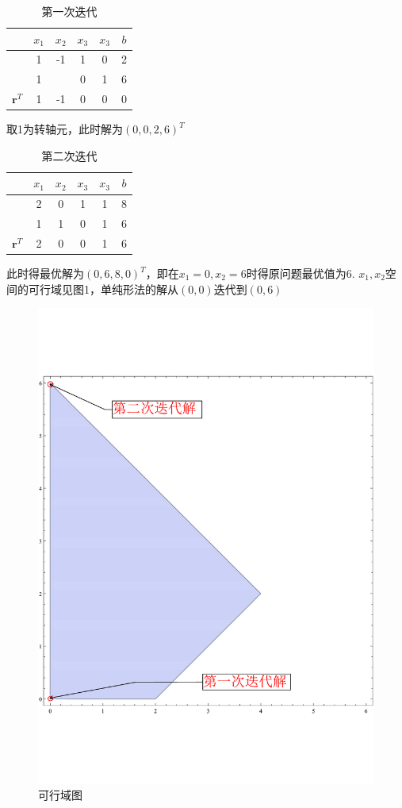 \documentclass[UTF8]{ctexart}
\begin{document}
\begin{enumerate}
\begin{table}[H]
\centering
	\begin{tabular}{cccccc}
	\toprule
	{}&$x_1$&$x_2$&$x_3$&$x_3$&$b$\\
	\midrule
	{}&1&-1&1&0&2\\
	{}&1&\boxed{1} &0&1&6\\
	$\bm{r}^T$&1&-1&0&0&0\\
	\bottomrule
	\end{tabular}
	\caption{第一次迭代}
\end{table}
取1为转轴元，此时解为$(0,0,2,6)^T$
\begin{table}[H]
\centering
	\begin{tabular}{cccccc}
	\toprule
	{}&$x_1$&$x_2$&$x_3$&$x_3$&$b$\\
	\midrule
	{}&2&0&1&1&8\\
	{}&1&1 &0&1&6\\
	$\bm{r}^T$&2&0&0&1&6\\
	\bottomrule
	\end{tabular}
	\caption{第二次迭代}
\end{table}

此时得最优解为$(0,6,8,0)^T$，即在$x_1=0,x_2=6$时得原问题最优值为6.
$x_1,x_2$空间的可行域见图1，单纯形法的解从$(0,0)$迭代到$(0,6)$
\begin{figure}[H]
\small
\centering
\includegraphics[width=12cm]{flow2.pdf}
\caption{可行域图}
\label{fig:1}
\end{figure}


\end{enumerate}
\end{document}

